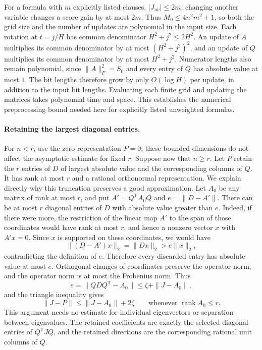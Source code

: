 \documentclass[11pt,a4paper]{article}
\theoremstyle{definition}
\theoremstyle{remark}
\DeclareMathOperator{\rank}{rank}
\begin{document}
For a formula with $m$ explicitly listed clauses, $|J_{uv}|\le2m$:
changing another variable changes a score gain by at most $2m$.
Thus $M_0\le4n^2m^2+1$, so both the grid size and the number of updates
are polynomial in the input size. Each rotation at $t=j/H$ has common
denominator $H^2+j^2\le2H^2$. An update of $A$ multiplies its common denominator by at most
$(H^2+j^2)^2$, and an update of $Q$ multiplies its common denominator by
at most $H^2+j^2$. Numerator lengths also remain polynomial, since
$\|A\|_F^2=S_0$ and every entry of $Q$ has absolute value at most $1$.
The bit lengths therefore grow by only $O(\log H)$ per update, in addition
to the input bit lengths. Evaluating each finite grid and updating the
matrices takes polynomial time and space. This establishes the numerical
preprocessing bound needed here for explicitly listed unweighted formulas.

\paragraph{Retaining the largest diagonal entries.}
For $n<r$, use the zero representation $P=0$; these bounded dimensions
do not affect the asymptotic estimate for fixed $r$. Suppose now that
$n\ge r$.
Let $P$ retain the $r$ entries of $D$ of largest absolute value and the
corresponding columns of $Q$. It has rank
at most $r$ and a rational orthonormal representation. We explain directly
why this truncation preserves a good approximation. Let $A_0$ be any matrix
of rank at most $r$, and put $A'=Q^{\mathsf T}A_0Q$ and
$e=\|D-A'\|$. There can be at most $r$ diagonal entries of $D$ with
absolute value greater than $e$. Indeed, if there were more, the restriction
of the linear map $A'$ to the span of those coordinates would have rank
at most $r$, and hence a nonzero vector $x$ with $A'x=0$. Since $x$ is supported on these coordinates, we would have
\[
 \|(D-A')x\|_2=\|Dx\|_2>e\|x\|_2,
\]
contradicting the definition of $e$. Therefore every discarded entry has
absolute value at most $e$. Orthogonal changes of coordinates preserve the
operator norm, and the operator norm is at most the Frobenius norm. Thus
\[
 e=\|QDQ^{\mathsf T}-A_0\|
 \le\zeta+\|J-A_0\|,
\]
and the triangle inequality gives
\begin{equation}
 \|J-P\|\le\|J-A_0\|+2\zeta
 \qquad\text{whenever }\rank A_0\le r.\label{eq:spectral-tail}
\end{equation}
This argument needs no estimate for individual eigenvectors or separation
between eigenvalues. The retained coefficients are exactly the selected
diagonal entries of $Q^{\mathsf T}JQ$, and the retained directions are the
corresponding rational unit columns of $Q$.
\end{document}

